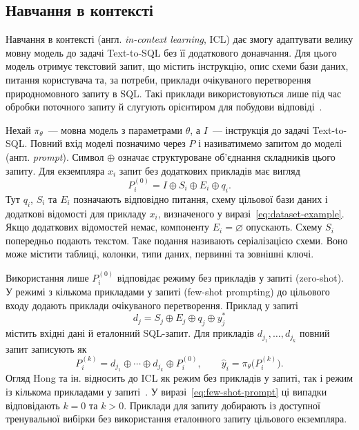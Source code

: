 \documentclass[a4paper,14pt,oneside]{extreport}
\begin{document}
\subsection{Навчання в контексті}

Навчання в контексті (англ. \textit{in-context learning}, ICL) дає змогу адаптувати велику мовну модель до задачі Text-to-SQL без її додаткового донавчання. Для цього модель отримує текстовий запит, що містить інструкцію, опис схеми бази даних, питання користувача та, за потреби, приклади очікуваного перетворення природномовного запиту в SQL. Такі приклади використовуються лише під час обробки поточного запиту й слугують орієнтиром для побудови відповіді~\cite{hong2025nextgeneration}.

Нехай \(\pi_\theta\)~--- мовна модель з параметрами \(\theta\), а \(I\)~--- інструкція до задачі Text-to-SQL. Повний вхід моделі позначимо через \(P\) і називатимемо запитом до моделі (англ. \textit{prompt}). Символ \(\oplus\) означає структуроване об’єднання складників цього запиту. Для екземпляра \(x_i\) запит без додаткових прикладів має вигляд
\begin{equation}
\label{eq:zero-shot-prompt}
P_i^{(0)}=I\oplus S_i\oplus E_i\oplus q_i.
\end{equation}
Тут \(q_i\), \(S_i\) та \(E_i\) позначають відповідно питання, схему цільової бази даних і додаткові відомості для прикладу \(x_i\), визначеного у виразі~\eqref{eq:dataset-example}. Якщо додаткових відомостей немає, компоненту \(E_i=\varnothing\) опускають. Схему \(S_i\) попередньо подають текстом. Таке подання називають серіалізацією схеми. Воно може містити таблиці, колонки, типи даних, первинні та зовнішні ключі.

Використання лише \(P_i^{(0)}\) відповідає режиму без прикладів у запиті (zero-shot). У режимі з кількома прикладами у запиті (few-shot prompting) до цільового входу додають приклади очікуваного перетворення. Приклад у запиті
\[
d_j=S_j\oplus E_j\oplus q_j\oplus y_j^*
\]
містить вхідні дані й еталонний SQL-запит. Для прикладів \(d_{j_1},\ldots,d_{j_k}\) повний запит записують як
\begin{equation}
\label{eq:few-shot-prompt}
P_i^{(k)}=d_{j_1}\oplus\cdots\oplus d_{j_k}\oplus P_i^{(0)},
\qquad
\widehat y_i=\pi_\theta\bigl(P_i^{(k)}\bigr).
\end{equation}
Огляд Hong та ін. відносить до ICL як режим без прикладів у запиті, так і режим із кількома прикладами у запиті~\cite{hong2025nextgeneration}. У виразі~\eqref{eq:few-shot-prompt} ці випадки відповідають \(k=0\) та \(k>0\). Приклади для запиту добирають із доступної тренувальної вибірки без використання еталонного запиту цільового екземпляра.
\end{document}
